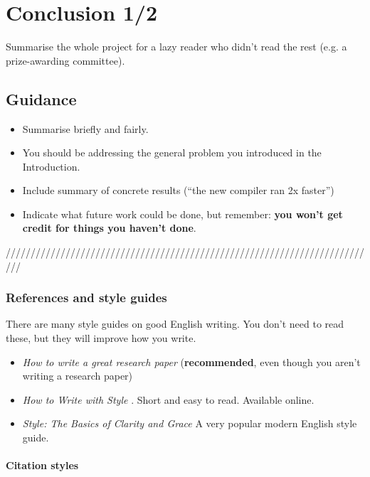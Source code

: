 \documentclass{l4proj}
\begin{document}
\chapter{Conclusion 1/2}   
Summarise the whole project for a lazy reader who didn't read the rest (e.g. a prize-awarding committee).
\section{Guidance}
\begin{itemize}
  \item
    Summarise briefly and fairly.
  \item
    You should be addressing the general problem you introduced in the
    Introduction.     
  \item
    Include summary of concrete results (``the new compiler ran 2x
    faster'')
  \item
    Indicate what future work could be done, but remember: \textbf{you
    won't get credit for things you haven't done}.
\end{itemize}


///////////////////////////////////////////////////////////////////////////

\subsection{References and style guides}
There are many style guides on good English writing. You don't need to
read these, but they will improve how you write.

\begin{itemize}
  \item
  \emph{How to write a great research paper} \cite{Pey17} (\textbf{recommended}, even though you aren't writing a research paper)
  \item
  \emph{How to Write with Style} \cite{Von80}. Short and easy to read. Available online.
  \item
  \emph{Style: The Basics of Clarity and Grace} \cite{Wil09} A very popular modern English style guide.
\end{itemize}

\subsubsection{Citation styles}
\end{document}
